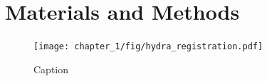 

\section{Materials and Methods}
\label{c1:sec:materials_and_methods}
\begin{figure}
    \centering
    \texttt{[image: chapter\_1/fig/hydra\_registration.pdf]}
    \caption{Caption}
    \label{c1:fig:hydra_registration}
\end{figure}

